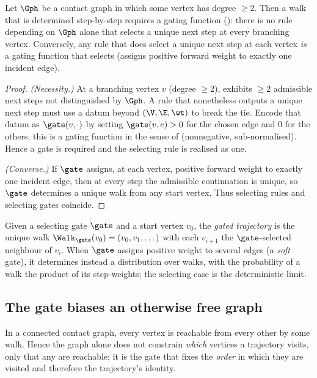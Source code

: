 \begin{theorem}
\label{thm:gate-necessary}
Let $\Gph$ be a contact graph in which some vertex has degree $\ge2$. Then a walk
that is determined step-by-step requires a gating function
\textup{(}\textup{)}: there is no rule depending on $\Gph$ alone
that selects a unique next step at every branching vertex. Conversely, any rule
that does select a unique next step at each vertex \emph{is} a gating function
that selects \textup{(}assigns positive forward weight to exactly one incident
edge\textup{)}.
\end{theorem}

\begin{proof}
\emph{(Necessity.)} At a branching vertex $v$ (degree $\ge2$), 
exhibits $\ge2$ admissible next steps not distinguished by $\Gph$. A rule that
nonetheless outputs a unique next step must use a datum beyond $(\V,\E,\wt)$ to
break the tie. Encode that datum as $\gate(v,\cdot)$ by setting
$\gate(v,e)>0$ for the chosen edge and $0$ for the others; this is a gating
function in the sense of  (nonnegative, sub-normalised). Hence a
gate is required and the selecting rule is realised as one.

\emph{(Converse.)} If $\gate$ assigns, at each vertex, positive forward weight to
exactly one incident edge, then at every step the admissible continuation is
unique, so $\gate$ determines a unique walk from any start vertex. Thus selecting
rules and selecting gates coincide.
\end{proof}

\begin{definition}
\label{def:gated-walk}
Given a selecting gate $\gate$ and a start vertex $v_0$, the \emph{gated
trajectory} is the unique walk $\Walk_\gate(v_0)=(v_0,v_1,\dots)$ with each
$v_{i+1}$ the $\gate$-selected neighbour of $v_i$. When $\gate$ assigns positive
weight to several edges \textup{(}a \emph{soft} gate\textup{)}, it determines
instead a distribution over walks, with the probability of a walk the product of
its step-weights; the selecting case is the deterministic limit.
\end{definition}

\subsection{The gate biases an otherwise free graph}

\begin{proposition}
\label{prop:reachability}
In a connected contact graph, every vertex is reachable from every other by some
walk. Hence the graph alone does not constrain \emph{which} vertices a trajectory
visits, only that any are reachable; it is the gate that fixes the \emph{order}
in which they are visited and therefore the trajectory's identity.
\end{proposition}

